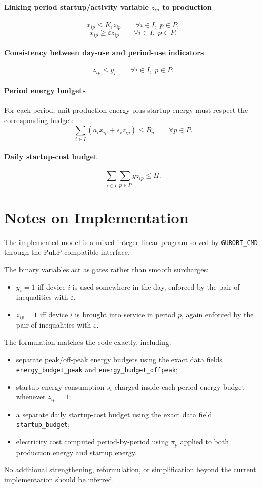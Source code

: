 \paragraph{Linking period startup/activity variable \(z_{ip}\) to production}
\[
x_{ip} \le K_i z_{ip}
\qquad \forall i\in I,\; p\in P,
\]
\[
x_{ip} \ge \varepsilon z_{ip}
\qquad \forall i\in I,\; p\in P.
\]

\paragraph{Consistency between day-use and period-use indicators}
\[
z_{ip} \le y_i
\qquad \forall i\in I,\; p\in P.
\]

\paragraph{Period energy budgets}
For each period, unit-production energy plus startup energy must respect the corresponding budget:
\[
\sum_{i\in I}\left(a_i x_{ip}+s_i z_{ip}\right) \le B_p
\qquad \forall p\in P.
\]

\paragraph{Daily startup-cost budget}
\[
\sum_{i\in I}\sum_{p\in P} g z_{ip} \le H.
\]

\section*{Notes on Implementation}

The implemented model is a mixed-integer linear program solved by \texttt{GUROBI\_CMD} through the PuLP-compatible interface.

The binary variables act as gates rather than smooth surcharges:
\begin{itemize}
    \item \(y_i=1\) iff device \(i\) is used somewhere in the day, enforced by the pair of inequalities with \(\varepsilon\).
    \item \(z_{ip}=1\) iff device \(i\) is brought into service in period \(p\), again enforced by the pair of inequalities with \(\varepsilon\).
\end{itemize}

The formulation matches the code exactly, including:
\begin{itemize}
    \item separate peak/off-peak energy budgets using the exact data fields \texttt{energy\_budget\_peak} and \texttt{energy\_budget\_offpeak};
    \item startup energy consumption \(s_i\) charged inside each period energy budget whenever \(z_{ip}=1\);
    \item a separate daily startup-cost budget using the exact data field \texttt{startup\_budget};
    \item electricity cost computed period-by-period using \(\pi_p\) applied to both production energy and startup energy.
\end{itemize}

No additional strengthening, reformulation, or simplification beyond the current implementation should be inferred.
